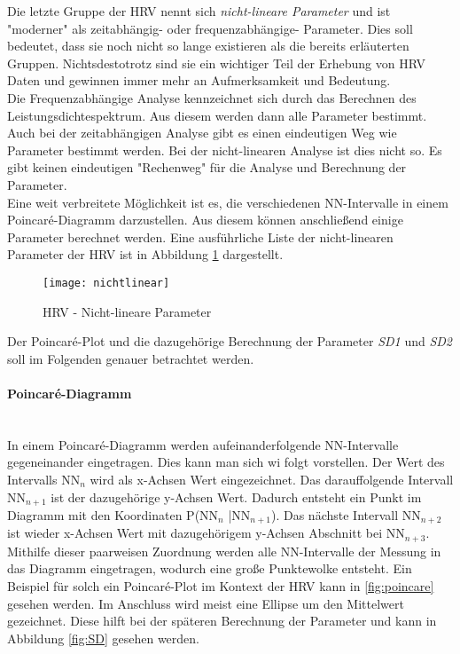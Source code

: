  Die letzte Gruppe der HRV nennt sich \textit{nicht-lineare Parameter} und ist "moderner" als zeitabhängig- oder frequenzabhängige- Parameter. Dies soll bedeutet, dass sie noch nicht so lange existieren als die bereits erläuterten Gruppen. Nichtsdestotrotz sind sie ein wichtiger Teil der Erhebung von HRV Daten und gewinnen immer mehr an Aufmerksamkeit und Bedeutung.\\
 \color{red} 
 Die Frequenzabhängige Analyse kennzeichnet sich durch das Berechnen des Leistungsdichtespektrum. Aus diesem werden dann alle Parameter bestimmt. Auch bei der zeitabhängigen Analyse gibt es einen eindeutigen Weg wie Parameter bestimmt werden. Bei der nicht-linearen Analyse ist dies nicht so. Es gibt keinen eindeutigen "Rechenweg" für die Analyse und Berechnung der Parameter. \\ \color{black} 
 Eine  weit verbreitete Möglichkeit ist es, die verschiedenen NN-Intervalle in einem Poincaré-Diagramm darzustellen. Aus diesem können anschließend einige Parameter berechnet werden. Eine ausführliche Liste der nicht-linearen Parameter der HRV ist in Abbildung  \ref{fig:nichtlinear} dargestellt.
  \begin{figure}[H]
 	\centering
 	\texttt{[image: nichtlinear]}
 	\caption{HRV - Nicht-lineare Parameter}
 	\label{fig:nichtlinear}
 	\cite[S.3]{med}
 \end{figure}
 
 Der Poincaré-Plot und die dazugehörige Berechnung der Parameter \textit{SD1} und \textit{SD2} soll im Folgenden genauer betrachtet werden.
 
 \paragraph{Poincaré-Diagramm}\mbox{} \\
 In einem Poincaré-Diagramm werden aufeinanderfolgende NN-Intervalle gegeneinander eingetragen. Dies kann man sich wi folgt vorstellen.
 Der Wert des Intervalls NN$_{n}$  wird als x-Achsen Wert eingezeichnet. Das darauffolgende Intervall NN$_{n+1}$ ist der dazugehörige y-Achsen Wert. Dadurch entsteht ein Punkt im Diagramm mit den Koordinaten P(NN$_{n}$ |NN$_{n+1}$). Das nächste Intervall NN$_{n+2}$ ist wieder x-Achsen Wert mit dazugehörigem y-Achsen Abschnitt bei NN$_{n+3}$. Mithilfe dieser paarweisen Zuordnung werden alle NN-Intervalle der Messung in das Diagramm eingetragen, wodurch eine große Punktewolke entsteht. Ein Beispiel für solch ein  Poincaré-Plot im Kontext der HRV kann in \ref{fig:poincare} gesehen werden. Im Anschluss wird meist eine Ellipse um den Mittelwert gezeichnet. Diese hilft bei der späteren Berechnung der Parameter und kann in Abbildung \ref{fig:SD} gesehen werden.\cite{poincare}

